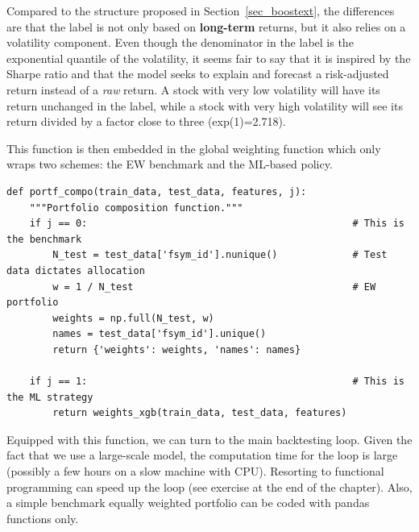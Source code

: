 Compared to the structure proposed in Section~\ref{sec_boostext}, the differences are that the label is not only based on \textbf{long-term} returns, but it also relies on a volatility component. Even though the denominator in the label is the exponential quantile of the volatility, it seems fair to say that it is inspired by the Sharpe ratio and that the model seeks to explain and forecast a risk-adjusted return instead of a \textit{raw} return. A stock with very low volatility will have its return unchanged in the label, while a stock with very high volatility will see its return divided by a factor close to three (exp(1)=2.718).

This function is then embedded in the global weighting function which only wraps two schemes: the EW benchmark and the ML-based policy.

\begin{verbatim}
def portf_compo(train_data, test_data, features, j):
    """Portfolio composition function."""
    if j == 0:                                              # This is the benchmark
        N_test = test_data['fsym_id'].nunique()             # Test data dictates allocation
        w = 1 / N_test                                      # EW portfolio
        weights = np.full(N_test, w)
        names = test_data['fsym_id'].unique()
        return {'weights': weights, 'names': names}
    
    if j == 1:                                              # This is the ML strategy
        return weights_xgb(train_data, test_data, features)
\end{verbatim}

Equipped with this function, we can turn to the main backtesting loop. Given the fact that we use a large-scale model, the computation time for the loop is large (possibly a few hours on a slow machine with CPU). Resorting to functional programming can speed up the loop (see exercise at the end of the chapter). Also, a simple benchmark equally weighted portfolio can be coded with pandas functions only.

